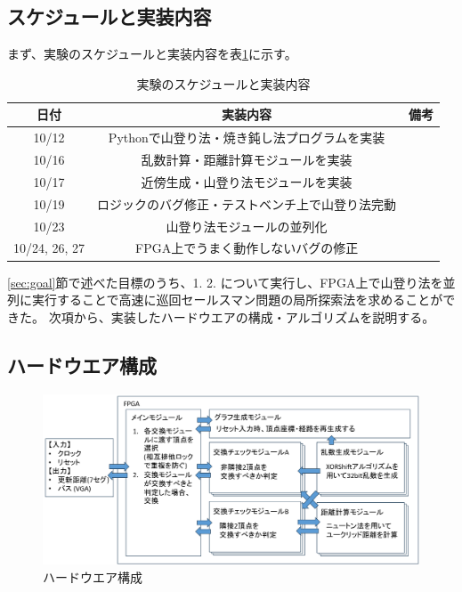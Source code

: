 \subsection{スケジュールと実装内容}
まず、実験のスケジュールと実装内容を表\ref{tab:schedule}に示す。
\begin{table}
    \begin{center}
        \caption{実験のスケジュールと実装内容}\label{tab:schedule}
        \begin{tabular}{|c|c|c|} \hline
            日付 & 実装内容 & 備考 \\ \hline
            10/12 & Pythonで山登り法・焼き鈍し法プログラムを実装 &  \\ \hline
            10/16 & 乱数計算・距離計算モジュールを実装 &  \\ \hline
            10/17 & 近傍生成・山登り法モジュールを実装 &  \\ \hline
            10/19 & ロジックのバグ修正・テストベンチ上で山登り法完動 &  \\ \hline
            10/23 & 山登り法モジュールの並列化 &  \\ \hline
            10/24, 26, 27 & FPGA上でうまく動作しないバグの修正 &  \\ \hline
        \end{tabular}
    \end{center}
\end{table}
\ref{sec:goal}節で述べた目標のうち、1. 2. について実行し、FPGA上で山登り法を並列に実行することで高速に巡回セールスマン問題の局所探索法を求めることができた。
次項から、実装したハードウエアの構成・アルゴリズムを説明する。

\subsection{ハードウエア構成}
\begin{figure}
    \caption{ハードウエア構成}\label{fig:hardware}
    \begin{center}
        \includegraphics[width=15cm]{figure/hardware.png}
    \end{center}
\end{figure}

